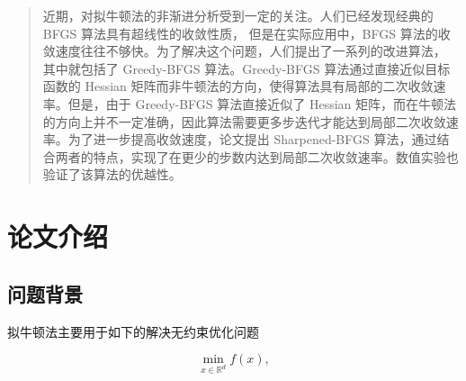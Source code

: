 \documentclass[a4paper,twoside,AutoFakeBold]{article}
\theoremstyle{definition}
\begin{document}

\maketitle
\thispagestyle{empty} \cleardoublepage

\rptcontent \thispagestyle{empty} \cleardoublepage

\begin{abstract}\kaiti \xiaosi
近期，对拟牛顿法的非渐进分析受到一定的关注。人们已经发现经典的 BFGS 算法具有超线性的收敛性质，
但是在实际应用中，BFGS 算法的收敛速度往往不够快。为了解决这个问题，人们提出了一系列的改进算法，
其中就包括了 Greedy-BFGS 算法。Greedy-BFGS 算法通过直接近似目标函数的 Hessian 矩阵而非牛顿法的方向，使得算法具有局部的二次收敛速率。但是，由于 Greedy-BFGS 算法直接近似了 Hessian 矩阵，而在牛顿法的方向上并不一定准确，因此算法需要更多步迭代才能达到局部二次收敛速率。为了进一步提高收敛速度，论文提出 Sharpened-BFGS 算法，通过结合两者的特点，实现了在更少的步数内达到局部二次收敛速率。数值实验也验证了该算法的优越性。
\end{abstract}
\cleardoublepage

\songti\xiaosi
%
\section{论文介绍}
\subsection{问题背景}
拟牛顿法主要用于如下的解决无约束优化问题

\begin{equation}\label{main_prob}
    \min_{x \in \mathbb{R}^d} f(x),
\end{equation}
\end{document}

